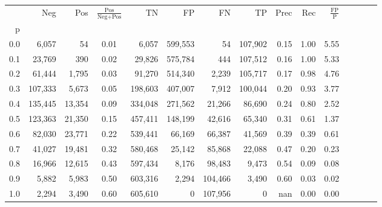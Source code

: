\begin{tabular}{rrrcrrrrrrrrrrr}
\toprule
{} &      Neg &     Pos & $\frac{\text{Pos}}{\text{Neg}+\text{Pos}}$ &       TN &       FP &       FN &       TP &  Prec &   Rec & $\frac{\text{FP}}{\text{P}}$ \\
p   &          &         &                                            &          &          &          &          &       &       &                              \\
\midrule
0.0 &    6,057 &      54 &                                       0.01 &    6,057 &  599,553 &       54 &  107,902 &  0.15 &  1.00 &                         5.55 \\
0.1 &   23,769 &     390 &                                       0.02 &   29,826 &  575,784 &      444 &  107,512 &  0.16 &  1.00 &                         5.33 \\
0.2 &   61,444 &   1,795 &                                       0.03 &   91,270 &  514,340 &    2,239 &  105,717 &  0.17 &  0.98 &                         4.76 \\
0.3 &  107,333 &   5,673 &                                       0.05 &  198,603 &  407,007 &    7,912 &  100,044 &  0.20 &  0.93 &                         3.77 \\
0.4 &  135,445 &  13,354 &                                       0.09 &  334,048 &  271,562 &   21,266 &   86,690 &  0.24 &  0.80 &                         2.52 \\
0.5 &  123,363 &  21,350 &                                       0.15 &  457,411 &  148,199 &   42,616 &   65,340 &  0.31 &  0.61 &                         1.37 \\
0.6 &   82,030 &  23,771 &                                       0.22 &  539,441 &   66,169 &   66,387 &   41,569 &  0.39 &  0.39 &                         0.61 \\
0.7 &   41,027 &  19,481 &                                       0.32 &  580,468 &   25,142 &   85,868 &   22,088 &  0.47 &  0.20 &                         0.23 \\
0.8 &   16,966 &  12,615 &                                       0.43 &  597,434 &    8,176 &   98,483 &    9,473 &  0.54 &  0.09 &                         0.08 \\
0.9 &    5,882 &   5,983 &                                       0.50 &  603,316 &    2,294 &  104,466 &    3,490 &  0.60 &  0.03 &                         0.02 \\
1.0 &    2,294 &   3,490 &                                       0.60 &  605,610 &        0 &  107,956 &        0 &   nan &  0.00 &                         0.00 \\
\bottomrule
\end{tabular}

